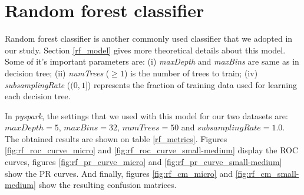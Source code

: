 \documentclass[LaM,binding=0.6cm, english]{sapthesis}
\begin{document}
\section{Random forest classifier}

Random forest classifier is another commonly used classifier that we adopted in our study. Section \ref{rf_model} gives more theoretical details about this model. Some of it's important parameters are: (i) \textit{maxDepth} and \textit{maxBins} are same as in decision tree; (ii) \textit{numTrees} ($\ge 1$) is the number of trees to train; (iv) \textit{subsamplingRate} ($(0, 1]$) represents the fraction of training data used for learning each decision tree.\cite{pysparkRF}

In \textit{pyspark}, the settings that we used with this model for our two datasets are: $maxDepth = 5$, $maxBins = 32$, $numTrees = 50$ and $subsamplingRate = 1.0$. The obtained results are shown on table \ref{rf_metrics}. Figures \ref{fig:rf_roc_curve_micro} and \ref{fig:rf_roc_curve_small-medium} display the ROC curves, figures \ref{fig:rf_pr_curve_micro} and \ref{fig:rf_pr_curve_small-medium} show the PR curves. And finally, figures \ref{fig:rf_cm_micro} and \ref{fig:rf_cm_small-medium} show the resulting confusion matrices.
 
\begin{table}[!ht]
\centering
{}
\vspace{2mm}
\caption{Random forest classifier metrics}
\label{rf_metrics}
\end{table}
\end{document}
